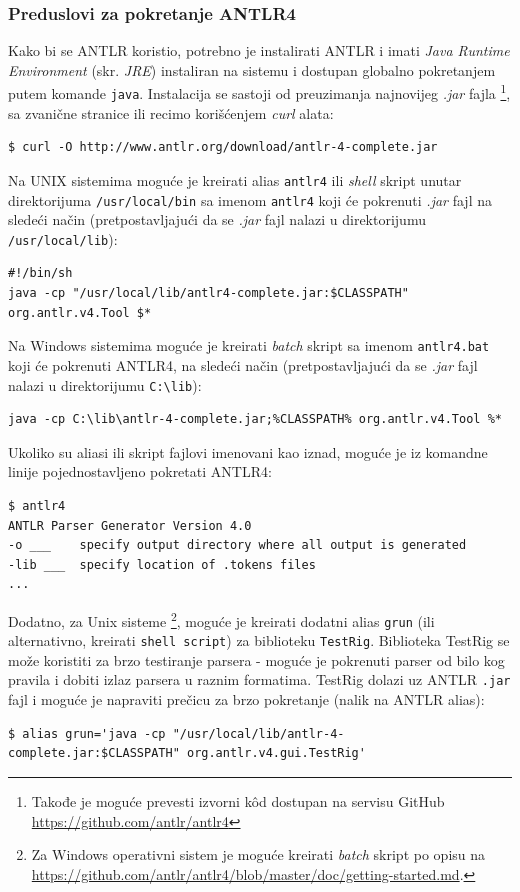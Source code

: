 \subsubsection{Preduslovi za pokretanje ANTLR4}
\label{subsubsec:ANTLRInstallation}

Kako bi se ANTLR koristio, potrebno je instalirati ANTLR i imati \emph{Java Runtime Environment} (skr. \emph{JRE}) instaliran na sistemu i dostupan globalno pokretanjem putem komande \texttt{java}. Instalacija se sastoji od preuzimanja najnovijeg \emph{.jar} fajla
\footnote{Takođe je moguće prevesti izvorni k\^od dostupan na servisu GitHub \url{https://github.com/antlr/antlr4}}, sa zvanične stranice \cite{ANTLR} ili recimo korišćenjem \emph{curl} alata: 
\begin{lstlisting}[language={}]
$ curl -O http://www.antlr.org/download/antlr-4-complete.jar
\end{lstlisting}

Na UNIX sistemima moguće je kreirati alias \texttt{antlr4} ili \emph{shell} skript unutar direktorijuma \texttt{/usr/local/bin} sa imenom \texttt{antlr4} koji će pokrenuti \emph{.jar} fajl na sledeći način (pretpostavljajući da se \emph{.jar} fajl nalazi u direktorijumu \texttt{/usr/local/lib}):
\begin{lstlisting}[language={}]
#!/bin/sh
java -cp "/usr/local/lib/antlr4-complete.jar:$CLASSPATH" org.antlr.v4.Tool $*
\end{lstlisting}

Na Windows sistemima moguće je kreirati \emph{batch} skript sa imenom \texttt{antlr4.bat} koji će pokrenuti ANTLR4, na sledeći način (pretpostavljajući da se \emph{.jar} fajl nalazi u direktorijumu \texttt{C:\textbackslash{}lib}):
\begin{lstlisting}[language={}]
java -cp C:\lib\antlr-4-complete.jar;%CLASSPATH% org.antlr.v4.Tool %*
\end{lstlisting}

Ukoliko su aliasi ili skript fajlovi imenovani kao iznad, moguće je iz komandne linije pojednostavljeno pokretati ANTLR4:  
\begin{lstlisting}[language={}]
$ antlr4
ANTLR Parser Generator Version 4.0
-o ___    specify output directory where all output is generated
-lib ___  specify location of .tokens files
...
\end{lstlisting}

Dodatno, za Unix sisteme \footnote{Za Windows operativni sistem je moguće kreirati \emph{batch} skript po opisu na \url{https://github.com/antlr/antlr4/blob/master/doc/getting-started.md}.}, moguće je kreirati dodatni alias \texttt{grun} (ili alternativno, kreirati \texttt{shell script}) za biblioteku \texttt{TestRig}. Biblioteka TestRig se može koristiti za brzo testiranje parsera - moguće je pokrenuti parser od bilo kog pravila i dobiti izlaz parsera u raznim formatima. TestRig dolazi uz ANTLR \texttt{.jar} fajl i moguće je napraviti prečicu za brzo pokretanje (nalik na ANTLR alias):
\begin{lstlisting}[language={}]
$ alias grun='java -cp "/usr/local/lib/antlr-4-complete.jar:$CLASSPATH" org.antlr.v4.gui.TestRig'
\end{lstlisting}


